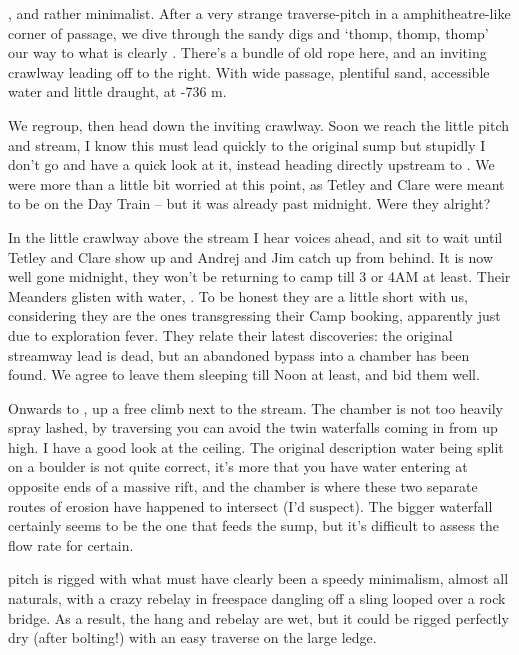 , and rather minimalist. After a very
strange traverse-pitch in a amphitheatre-like corner of passage, we dive
through the sandy digs and `thomp, thomp, thomp' our way to what is
clearly . There's a bundle of old rope here, and an
inviting crawlway leading off to the right. With wide passage, plentiful
sand, accessible water and little draught,  at -736 m.

We regroup, then head down the inviting crawlway. Soon we reach the
little pitch and stream, I know this must lead quickly to the original
 sump but stupidly I don't go and have a quick look at it,
instead heading directly upstream to . We were more
than a little bit worried at this point, as Tetley and Clare were meant
to be on the Day Train -- but it was already past midnight. Were they
alright?

In the little crawlway above the stream I hear voices ahead, and sit to
wait until Tetley and Clare show up and Andrej and Jim catch up from
behind. It is now well gone midnight, they won't be returning to camp
till 3 or 4AM at least. Their Meanders glisten with water, . To
be honest they are a little short with us, considering they are the ones
transgressing their Camp  booking, apparently just due to
exploration fever. They relate their latest discoveries: the original
streamway lead is dead, but an abandoned bypass into a chamber has been
found. We agree to leave them sleeping till Noon at least, and bid them
well.

Onwards to , up a free climb next to the stream. The
chamber is not too heavily spray lashed, by traversing you can avoid the
twin waterfalls coming in from up high. I have a good look at the
ceiling. The original description water being split on a boulder is not
quite correct, it's more that you have water entering at opposite ends
of a massive rift, and the  chamber is where these two
separate routes of erosion have happened to intersect (I'd suspect). The
bigger waterfall certainly seems to be the one that feeds the 
sump, but it's difficult to assess the flow rate for certain.

 pitch is rigged with what must have clearly been a
speedy minimalism, almost all naturals, with a crazy rebelay in
freespace dangling off a sling looped over a rock bridge. As a result,
the hang and rebelay are wet, but it could be rigged perfectly dry
(after bolting!) with an easy traverse on the large ledge.

